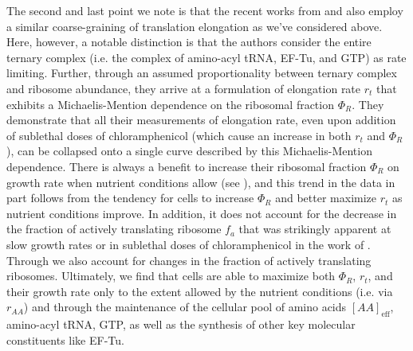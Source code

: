 The second and last point we note is that the recent works from \cite{dai2016}
and \cite{klumpp2013} also employ a similar coarse-graining of translation
elongation as we've considered above. Here, however, a notable distinction is
that the authors consider the entire ternary complex (i.e. the complex of
amino-acyl tRNA, EF-Tu, and GTP) as rate limiting. Further, through an assumed
proportionality between ternary complex and ribosome abundance, they arrive at a
formulation of elongation rate $r_t$ that exhibits a Michaelis-Mention
dependence on the ribosomal fraction $\Phi_R$. They demonstrate that all their
measurements of elongation rate, even upon addition of sublethal doses of
chloramphenicol (which cause an increase in both $r_t$ and $\Phi_R$), can be
collapsed onto a single curve described by this Michaelis-Mention dependence.
There is always a benefit to increase their ribosomal fraction $\Phi_R$ on
growth rate when nutrient conditions allow (see ), and this trend
in the data in part follows from the tendency for cells to increase $\Phi_R$ and
better maximize $r_t$ as nutrient conditions improve.  In addition, it does not
account for the decrease in the fraction of actively translating ribosome $f_a$
that was strikingly apparent at slow growth rates or in sublethal doses of
chloramphenicol in the work of \cite{dai2016}. Through  we also
account for changes in the fraction of actively translating ribosomes.
Ultimately, we find that cells are able to maximize both $\Phi_R$, $r_t$, and
their growth rate  only to the extent allowed by the nutrient conditions (i.e.
via $r_{AA}$) and through the maintenance of the cellular pool of amino acids
$[AA]_\text{eff}$, amino-acyl tRNA, GTP, as well as the synthesis of other key
molecular constituents like EF-Tu.
